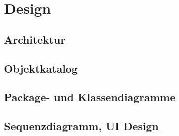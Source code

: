 \chapter{Design}
\label{pd-design}

\section{Architektur}


\section{Objektkatalog}


\section{Package- und Klassendiagramme}


\section{Sequenzdiagramm, UI Design}
